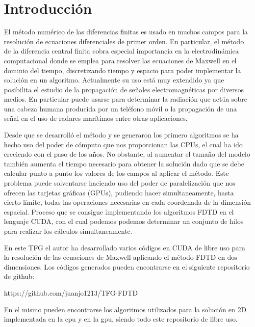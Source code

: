 \documentclass[11pt,a4paper,twoside,pdf]{article}
\numberwithin{equation}{section}
\begin{document}
\pagestyle{fancy}
\fancyhead[RO,LE]{\leftmark}
\fancyhead[LO,RE]{\thepage}
\fancyfoot{}

\section{Introducción}
El método numérico de las diferencias finitas es usado en muchos campos para la resolución de ecuaciones diferenciales de primer orden. En particular, el método de la diferencia central finita cobra especial importancia en la electrodinámica computacional donde se emplea para resolver las ecuaciones de Maxwell en el dominio del tiempo, discretizando tiempo y espacio para poder implementar la solución en un algoritmo.
Actualmente su uso está muy extendido ya que posibilita el estudio de la propagación de señales electromagnéticas por diversos medios. En particular puede usarse para determinar la radiación que actúa sobre una cabeza humana producida por un teléfono móvil o la propagación de una señal en el uso de radares marítimos entre otras aplicaciones.

Desde que se desarrolló el método y se generaron los primero algoritmos se ha hecho uso del poder de cómputo que nos proporcionan las CPUs, el cual ha ido creciendo con el paso de los años. No obstante, al aumentar el tamaño del modelo también aumenta el tiempo necesario para obtener la solución dado que se debe calcular punto a punto los valores de los campos al aplicar el método. Este problema puede solventarse haciendo uso del poder de paralelización que nos ofrecen las tarjetas gráficas (GPUs), pudiendo hacer simultaneamente, hasta cierto límite, todas las operaciones necesarias en cada coordenada de la dimensión espacial. Proceso que se consigue implementando los algoritmos FDTD en el lenguaje CUDA, con el cual podemos podemos determinar un conjunto de hilos para realizar los cálculos simultaneamente.

En este TFG el autor ha desarrollado varios códigos en CUDA de libre uso para la resolución de las ecuaciones de Maxwell aplicando el método FDTD en dos dimensiones. Los códigos generados pueden encontrarse en el siguiente repositorio de github:

https://github.com/juanjo1213/TFG-FDTD

En el mismo pueden encontrarse los algoritmos utilizados para la solución en 2D implementada en la cpu y en la gpu, siendo todo este repositorio de libre uso.

\newpage
\end{document}
